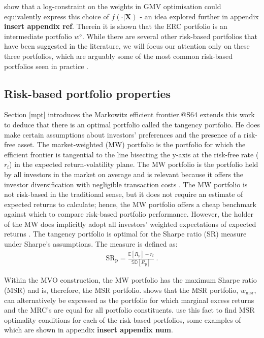\documentclass[
]{article}
\begin{document}
\citet{MRT10} show that a log-constraint on the weights in GMV optimisation could equivalently express this
choice of \(f(\cdot| \textbf{X})\) - an idea explored further in appendix \textbf{insert appendix ref}.
Therein it is shown that the ERC portfolio is an intermediate portfolio \(w^\diamond\). While there are
several other risk-based portfolios that have been suggested in the literature, we will focus our
attention only on these three portfolios, which are arguably some of the most common risk-based
portfolios seen in practice \citet{J13}.

\hypertarget{risk-based-portfolio-properties}{%
\subsection{Risk-based portfolio properties}\label{risk-based-portfolio-properties}}

Section \ref{mpt} introduces the Markowitz efficient frontier.@S64 extends this work to deduce that
there is an optimal portfolio called the tangency portfolio. He does make certain assumptions about
investors' preferences and the presence of a risk-free asset. The market-weighted (MW) portfolio is the
portfolio for which the efficient frontier is tangential to the line bisecting the y-axis at the
risk-free rate (\(r_\mathrm{f}\)) in the expected return-volatility plane. The MW portfolio is the
portfolio held by all investors in the market on average and is relevant because it offers the investor
diversification with negligible transaction costs \citet{P07}. The MW portfolio is not risk-based in the
traditional sense, but it does not require an estimate of expected returns to calculate; hence, the MW
portfolio offers a cheap benchmark against which to compare risk-based portfolio performance. However,
the holder of the MW does implicitly adopt all investors' weighted expectations of expected returns
\citet{H91}. The tangency portfolio is optimal for the Sharpe ratio (SR) measure under Sharpe's
assumptions. The measure is defined as:
\begin{align}
\text{SR}_\mathrm{p} = \frac{\mathbb{E}[R_\mathrm{p}] - r_\mathrm{f}}{\mathbb{SD}[R_\mathrm{p}]} \;.
\end{align}

Within the MVO construction, the MW portfolio has the maximum Sharpe ratio (MSR) and is, therefore, the
MSR portfolio. \citet{S07} shows that the MSR portfolio, \(w_\mathrm{msr}\), can alternatively be expressed
as the portfolio for which marginal excess returns and the MRC's are equal for all portfolio
constituents. \citet{J13} use this fact to find MSR optimality conditions for each of the risk-based
portfolios, some examples of which are shown in appendix \textbf{insert appendix num}.
\end{document}
